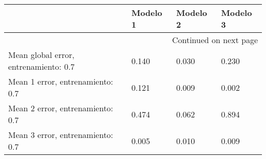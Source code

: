 \begin{longtable}{p{4cm}|p{2cm}|p{2cm}|p{2cm}}
\toprule
{} &  Modelo 1 &  Modelo 2 &  Modelo 3 \\
\midrule
\endhead
\midrule
\multicolumn{4}{r}{{Continued on next page}} \\
\midrule
\endfoot

\bottomrule
\endlastfoot
Mean global error, entrenamiento: 0.7 &     0.140 &     0.030 &     0.230 \\
Mean 1 error, entrenamiento: 0.7      &     0.121 &     0.009 &     0.002 \\
Mean 2 error, entrenamiento: 0.7      &     0.474 &     0.062 &     0.894 \\
Mean 3 error, entrenamiento: 0.7      &     0.005 &     0.010 &     0.009 \\
\end{longtable}
